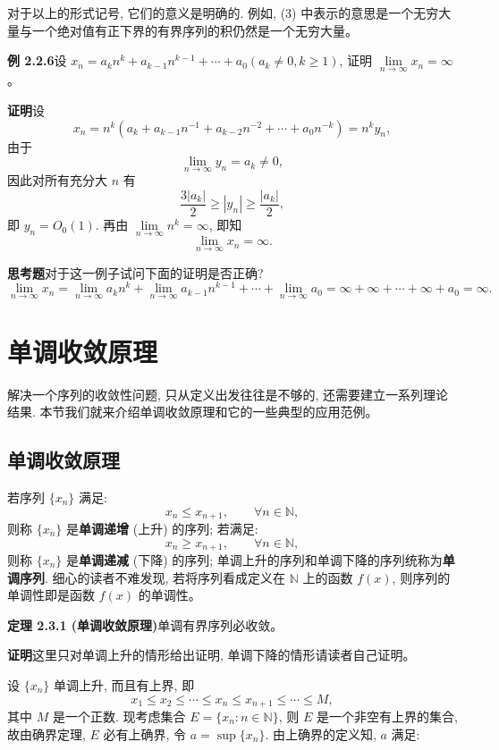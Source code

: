 \documentclass[UTF8,12pt,a4paper,fontset=fandol]{ctexart}
\begin{document}
对于以上的形式记号, 它们的意义是明确的. 例如, (3) 中表示的意思是一个无穷大量与一个绝对值有正下界的有界序列的积仍然是一个无穷大量。

\noindent\textbf{例 2.2.6}\quad 设 $x_n=a_kn^k+a_{k-1}n^{k-1}+\cdots+a_0(a_k\ne0,k\geqslant1)$, 证明 $\lim\limits_{n\to\infty}x_n=\infty$。

\noindent\textbf{证明}\quad 设
\[
  x_n=n^k(a_k+a_{k-1}n^{-1}+a_{k-2}n^{-2}+\cdots+a_0n^{-k})=n^ky_n,
\]
由于
\[
  \lim_{n\to\infty}y_n=a_k\ne0,
\]
因此对所有充分大 $n$ 有
\[
  \frac{3|a_k|}{2}\geqslant |y_n|\geqslant\frac{|a_k|}{2},
\]
即 $y_n=O_0(1)$. 再由 $\lim\limits_{n\to\infty}n^k=\infty$, 即知
\[
  \lim_{n\to\infty}x_n=\infty.
\]

\noindent\textbf{思考题}\quad 对于这一例子试问下面的证明是否正确?
\[
  \lim_{n\to\infty}x_n
  =
  \lim_{n\to\infty}a_kn^k+\lim_{n\to\infty}a_{k-1}n^{k-1}+\cdots+\lim_{n\to\infty}a_0
  =
  \infty+\infty+\cdots+\infty+a_0=\infty.
\]

\section{单调收敛原理}

解决一个序列的收敛性问题, 只从定义出发往往是不够的, 还需要建立一系列理论结果. 本节我们就来介绍单调收敛原理和它的一些典型的应用范例。

\subsection{单调收敛原理}

若序列 $\{x_n\}$ 满足:
\[
  x_n\leqslant x_{n+1},\qquad \forall n\in\mathbb{N},
\]
则称 $\{x_n\}$ 是\textbf{单调递增} (上升) 的序列; 若满足:
\[
  x_n\geqslant x_{n+1},\qquad \forall n\in\mathbb{N},
\]
则称 $\{x_n\}$ 是\textbf{单调递减} (下降) 的序列; 单调上升的序列和单调下降的序列统称为\textbf{单调序列}. 细心的读者不难发现, 若将序列看成定义在 $\mathbb{N}$ 上的函数 $f(x)$, 则序列的单调性即是函数 $f(x)$ 的单调性。

\noindent\textbf{定理 2.3.1 (单调收敛原理)}\quad 单调有界序列必收敛。

\noindent\textbf{证明}\quad 这里只对单调上升的情形给出证明, 单调下降的情形请读者自己证明。

设 $\{x_n\}$ 单调上升, 而且有上界, 即
\[
  x_1\leqslant x_2\leqslant\cdots\leqslant x_n\leqslant x_{n+1}\leqslant\cdots\leqslant M,
\]
其中 $M$ 是一个正数. 现考虑集合 $E=\{x_n:n\in\mathbb{N}\}$, 则 $E$ 是一个非空有上界的集合, 故由确界定理, $E$ 必有上确界, 令 $a=\sup\{x_n\}$. 由上确界的定义知, $a$ 满足:
\end{document}
